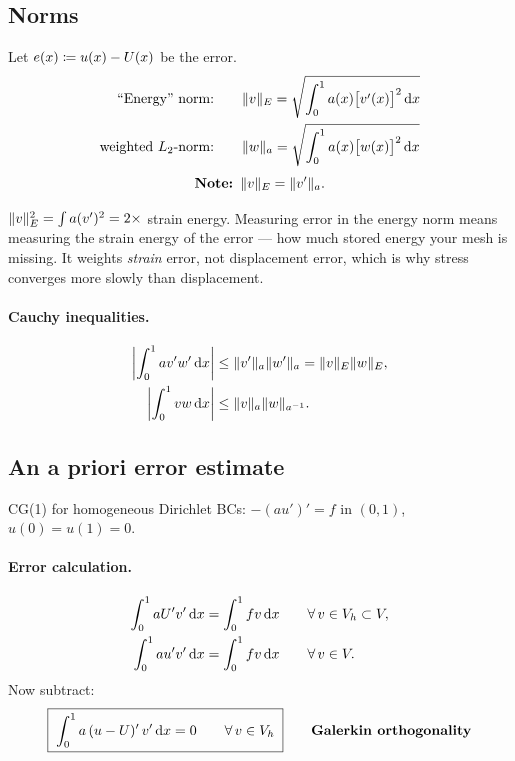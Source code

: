 \subsection*{Norms}

Let $e(x)\coloneqq u(x)-U(x)$ be the error.
\begin{align}
  \text{``Energy'' norm:}  &\qquad \lVert v\rVert_{E} = \sqrt{\int_{0}^{1} a(x)\bigl[v'(x)\bigr]^{2}\,\mathrm{d} x}\\
  \text{weighted $L_{2}$-norm:} &\qquad \lVert w\rVert_{a} = \sqrt{\int_{0}^{1} a(x)\bigl[w(x)\bigr]^{2}\,\mathrm{d} x}
\end{align}
\begin{equation}\label{eq:normlink}
  \textbf{Note: } \lVert v\rVert_{E}=\lVert v'\rVert_{a}.
\end{equation}

\begin{mechanics}
$\lVert v\rVert_{E}^{2}=\int a(v')^{2}=2\times$ strain energy. Measuring error in the
energy norm means measuring the strain energy of the error --- \ie how much
stored energy your mesh is missing. It weights \emph{strain} error, not
displacement error, which is why stress converges more slowly than displacement.
\end{mechanics}

\paragraph{Cauchy inequalities.}
\begin{align}
  \left|\int_{0}^{1} a v'w'\,\mathrm{d} x\right| &\le \lVert v'\rVert_{a}\lVert w'\rVert_{a}
     = \lVert v\rVert_{E}\lVert w\rVert_{E}, \label{eq:cauchyE}\\
  \left|\int_{0}^{1} v w\,\mathrm{d} x\right| &\le \lVert v\rVert_{a}\lVert w\rVert_{a^{-1}}.
\end{align}

\subsection*{An a priori error estimate}

CG(1) for homogeneous Dirichlet BCs: $-(au')'=f$ in $(0,1)$, $u(0)=u(1)=0$.

\paragraph{Error calculation.}
\begin{align}
  \int_{0}^{1} a U'v'\,\mathrm{d} x &= \int_{0}^{1} f v\,\mathrm{d} x \qquad \forall\, v\in V_{h}\subset V, \\
  \int_{0}^{1} a u'v'\,\mathrm{d} x &= \int_{0}^{1} f v\,\mathrm{d} x \qquad \forall\, v\in V .
\end{align}
Now subtract:
\begin{equation}\label{eq:GO}
  \boxed{\;\int_{0}^{1} a\,(u-U)'\,v'\,\mathrm{d} x = 0 \qquad \forall\, v\in V_{h}\;}
  \qquad \text{\textbf{Galerkin orthogonality}}
\end{equation}

